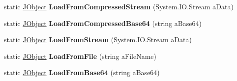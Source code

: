 \begin{DoxyCompactItemize}
\item 
\hypertarget{class_simple_j_s_o_n_1_1_j_object_a9123197b2bb99c61345cd52041ee8ce4}{static \hyperlink{class_simple_j_s_o_n_1_1_j_object}{J\+Object} {\bfseries Load\+From\+Compressed\+Stream} (System.\+I\+O.\+Stream a\+Data)}\label{class_simple_j_s_o_n_1_1_j_object_a9123197b2bb99c61345cd52041ee8ce4}

\item 
\hypertarget{class_simple_j_s_o_n_1_1_j_object_a8859c92fe603e574ddd65f4d9e91caea}{static \hyperlink{class_simple_j_s_o_n_1_1_j_object}{J\+Object} {\bfseries Load\+From\+Compressed\+Base64} (string a\+Base64)}\label{class_simple_j_s_o_n_1_1_j_object_a8859c92fe603e574ddd65f4d9e91caea}

\item 
\hypertarget{class_simple_j_s_o_n_1_1_j_object_adc988b3268aac17952a50b28ab55adff}{static \hyperlink{class_simple_j_s_o_n_1_1_j_object}{J\+Object} {\bfseries Load\+From\+Stream} (System.\+I\+O.\+Stream a\+Data)}\label{class_simple_j_s_o_n_1_1_j_object_adc988b3268aac17952a50b28ab55adff}

\item 
\hypertarget{class_simple_j_s_o_n_1_1_j_object_a5f0e8d3baece4d1bda9c161c25018348}{static \hyperlink{class_simple_j_s_o_n_1_1_j_object}{J\+Object} {\bfseries Load\+From\+File} (string a\+File\+Name)}\label{class_simple_j_s_o_n_1_1_j_object_a5f0e8d3baece4d1bda9c161c25018348}

\item 
\hypertarget{class_simple_j_s_o_n_1_1_j_object_adb3c71baa2b49ed0beeb8692e379c0b7}{static \hyperlink{class_simple_j_s_o_n_1_1_j_object}{J\+Object} {\bfseries Load\+From\+Base64} (string a\+Base64)}\label{class_simple_j_s_o_n_1_1_j_object_adb3c71baa2b49ed0beeb8692e379c0b7}

\end{DoxyCompactItemize}
